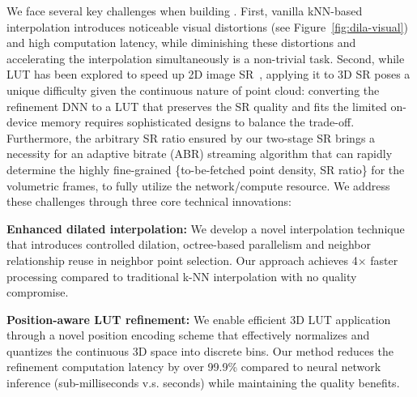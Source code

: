 We face several key challenges when building \name. 
%
First, vanilla kNN-based interpolation introduces noticeable visual distortions (see Figure~\ref{fig:dila-visual}) and high computation latency, while diminishing these distortions and accelerating the interpolation simultaneously is a non-trivial task.
%
Second, while LUT has been explored to speed up 2D image SR~\cite{jo_practical_2021, liu_4d_2022, yang_adaint_2022}, applying it to 3D SR poses a unique difficulty given the continuous nature of point cloud: converting the refinement DNN to a LUT that preserves the SR quality and fits the limited on-device memory requires sophisticated designs to balance the trade-off.
%
Furthermore, the arbitrary SR ratio ensured by our two-stage SR brings a necessity for an adaptive bitrate (ABR) streaming algorithm that can rapidly determine the highly fine-grained \{to-be-fetched point density, SR ratio\} for the volumetric frames, to fully utilize the network/compute resource.
%
%
We address these challenges through three core technical innovations:

\BULLET \textbf{Enhanced dilated interpolation:} We develop a novel interpolation technique that introduces controlled dilation, octree-based parallelism and neighbor relationship reuse in neighbor point selection. Our approach achieves 4$\times$ faster processing compared to traditional k-NN interpolation with no quality compromise.
    
\BULLET\textbf{Position-aware LUT refinement:} We enable efficient 3D LUT application through a novel position encoding scheme that effectively normalizes and quantizes the continuous 3D space into discrete bins. Our method reduces the refinement computation latency by over 99.9\% compared to neural network inference (sub-milliseconds v.s. seconds) while maintaining the quality benefits.
    
